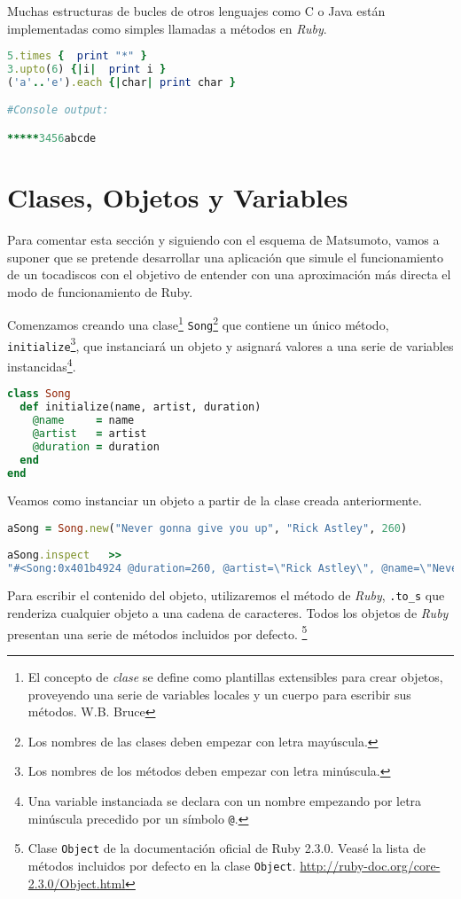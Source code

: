 Muchas estructuras de bucles de otros lenguajes como C o Java están implementadas como simples llamadas a métodos en \textit{Ruby}.

\begin{lstlisting}[language=Ruby]
5.times {  print "*" }
3.upto(6) {|i|  print i }
('a'..'e').each {|char| print char }

#Console output:

*****3456abcde
\end{lstlisting}

\section{Clases, Objetos y Variables}
Para comentar esta sección y siguiendo con el esquema de Matsumoto, vamos a suponer que se pretende desarrollar una aplicación que simule el funcionamiento de un tocadiscos con el objetivo de entender con una aproximación más directa el modo de funcionamiento de Ruby.

Comenzamos creando una clase\footnote{El concepto de \textit{clase} se define como plantillas extensibles para crear objetos, proveyendo una serie de variables locales y un cuerpo para escribir sus métodos. W.B. Bruce\cite{Bruce2002}} \texttt{Song}\footnote{Los nombres de las clases deben empezar con letra mayúscula.} que contiene un único método, \texttt{initialize}\footnote{Los nombres de los métodos deben empezar con letra minúscula.}, que instanciará un objeto y asignará valores a una serie de variables instancidas\footnote{Una variable instanciada se declara con un nombre empezando por letra minúscula precedido por un símbolo \texttt{@}.}.

\begin{lstlisting}[language=Ruby]
class Song
  def initialize(name, artist, duration)
    @name     = name
    @artist   = artist
    @duration = duration
  end
end
\end{lstlisting}

Veamos como instanciar un objeto a partir de la clase creada anteriormente.

\begin{lstlisting}[language=Ruby]
aSong = Song.new("Never gonna give you up", "Rick Astley", 260)
	
aSong.inspect	>>	
"#<Song:0x401b4924 @duration=260, @artist=\"Rick Astley\", @name=\"Never gonna give you up\">"
\end{lstlisting}

Para escribir el contenido del objeto, utilizaremos el método de \textit{Ruby}, \texttt{.to\_s} que renderiza cualquier objeto a una cadena de caracteres. Todos los objetos de \textit{Ruby} presentan una serie de métodos incluidos por defecto. \footnote{Clase \texttt{Object} de la documentación oficial de Ruby 2.3.0. Veasé la lista de métodos incluidos por defecto en la clase \texttt{Object}. \url{http://ruby-doc.org/core-2.3.0/Object.html}}

